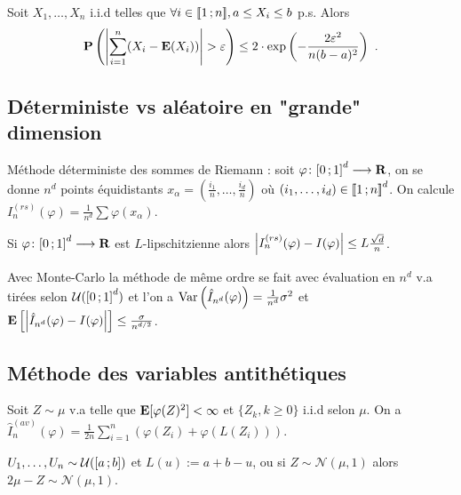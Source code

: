 	\begin{thm}
		Soit $X_1,\ldots,X_n$ i.i.d telles que $\forall i \in \mathopen{[\![}1\mathclose{}\mathpunct{};n\mathclose{]\!]}, a \leq X_i \leq b$ p.s.
		Alors
		$$\proba \left( \abs{\sum_{i = 1}^n (X_i - \esp(X_i)) } > \varepsilon \right) \leq 2 \cdot \exp \left( - \frac{2 \varepsilon^2}{n(b - a)^2} \right)\ .$$
	\end{thm}


\subsection{Déterministe vs aléatoire en "grande" dimension}

	\noindent Méthode déterministe des sommes de Riemann : soit $\varphi \colon \mathopen{[}0\mathclose{}\mathpunct{};1\mathclose{]}^d \longrightarrow \mathbf{R}$, on se donne $n^d$ points équidistants $x_\alpha = \left( \frac{i_1}{n},\ldots,\frac{i_d}{n} \right)$ où $(i_1,\ldots,i_d) \in \mathopen{}\mathclose{\left[\![1\mathclose{}\mathpunct{};n\right]\!]}^d$.
	On calcule $I_n^{(rs)}(\varphi) = \frac{1}{n^d} \sum \varphi (x_\alpha)$.

	\begin{pop}
		Si $\varphi \colon \mathopen{[}0\mathclose{}\mathpunct{};1\mathclose{]}^d \longrightarrow \mathbf{R}$ est $L$-lipschitzienne alors $\left\lvert I_n^{(rs)}(\varphi) - I(\varphi)\right\rvert \leq L \frac{\sqrt{d}}{n}$.
	\end{pop}

	\noindent Avec Monte-Carlo la méthode de même ordre se fait avec évaluation en $n^d$ v.a tirées selon $\mathcal{U}(\mathopen{[}0\mathclose{}\mathpunct{};1\mathclose{]}^d)$ et l'on a $\operatorname{Var} \left( \hat{I}_{n^d}(\varphi) \right) = \frac{1}{n^d} \sigma^2$ et $\mathbf{E} \left[ \left\lvert\hat{I}_{n^d}(\varphi) - I(\varphi)\right\rvert \right] \leq \frac{\sigma}{n^{d/2}}$.


\subsection{Méthode des variables antithétiques}

	\noindent Soit $Z \sim \mu$ v.a telle que $\mathbf{E}[\varphi(Z)^2] < \infty$ et $\{ Z_k, k \geq 0 \}$ i.i.d selon $\mu$.
	On a $\hat{I}_n^{(av)}(\varphi) = \frac{1}{2n} \sum_{i = 1}^n (\varphi(Z_i) + \varphi(L(Z_i)))$.
	
	\begin{ex}
		$U_1,\ldots,U_n \sim \mathcal{U}(\mathopen{[}a\mathclose{}\mathpunct{};b\mathclose{]})$ et $L(u) := a + b - u$, ou si $Z \sim \mathcal{N}(\mu,1)$ alors $2 \mu - Z \sim \mathcal{N}(\mu,1)$.
	\end{ex}
	
